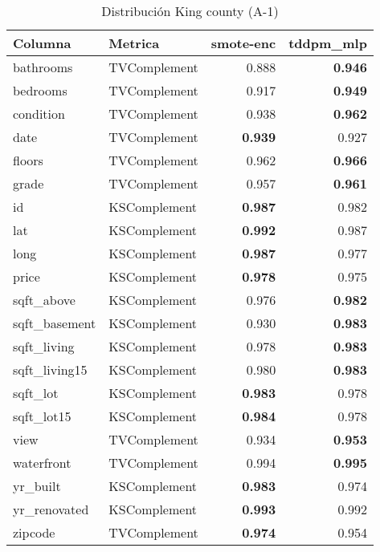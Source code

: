 \begin{table}[H]
\centering
\caption{Distribución King county (A-1)}
\label{table-shape-king county-a-1}
\begin{tabular}{|l|l|r|r|}
\hline
\rowcolor[gray]{0.8}
Columna & Metrica & smote-enc & tddpm\_mlp \\
\hline bathrooms & TVComplement & 0.888 & \bfseries 0.946 \\
\hline bedrooms & TVComplement & 0.917 & \bfseries 0.949 \\
\hline condition & TVComplement & 0.938 & \bfseries 0.962 \\
\hline date & TVComplement & \bfseries 0.939 & 0.927 \\
\hline floors & TVComplement & 0.962 & \bfseries 0.966 \\
\hline grade & TVComplement & 0.957 & \bfseries 0.961 \\
\hline id & KSComplement & \bfseries 0.987 & 0.982 \\
\hline lat & KSComplement & \bfseries 0.992 & 0.987 \\
\hline long & KSComplement & \bfseries 0.987 & 0.977 \\
\hline price & KSComplement & \bfseries 0.978 & 0.975 \\
\hline sqft\_above & KSComplement & 0.976 & \bfseries 0.982 \\
\hline sqft\_basement & KSComplement & 0.930 & \bfseries 0.983 \\
\hline sqft\_living & KSComplement & 0.978 & \bfseries 0.983 \\
\hline sqft\_living15 & KSComplement & 0.980 & \bfseries 0.983 \\
\hline sqft\_lot & KSComplement & \bfseries 0.983 & 0.978 \\
\hline sqft\_lot15 & KSComplement & \bfseries 0.984 & 0.978 \\
\hline view & TVComplement & 0.934 & \bfseries 0.953 \\
\hline waterfront & TVComplement & 0.994 & \bfseries 0.995 \\
\hline yr\_built & KSComplement & \bfseries 0.983 & 0.974 \\
\hline yr\_renovated & KSComplement & \bfseries 0.993 & 0.992 \\
\hline zipcode & TVComplement & \bfseries 0.974 & 0.954 \\
\hline
\end{tabular}
\end{table}

